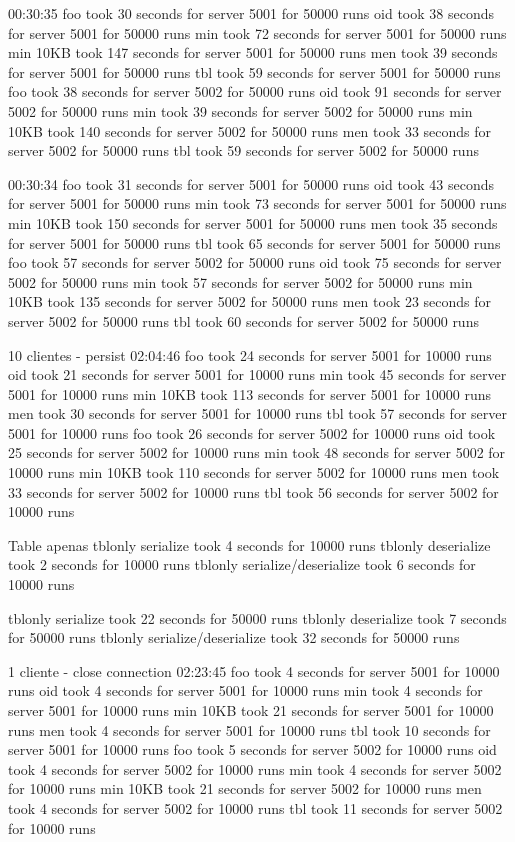 \documentclass[11pt]{article}
\begin{document}
00:30:35
foo took 30 seconds for server 5001 for 50000 runs
oid took 38 seconds for server 5001 for 50000 runs
min took 72 seconds for server 5001 for 50000 runs
min 10KB took 147 seconds for server 5001 for 50000 runs
men took 39 seconds for server 5001 for 50000 runs
tbl took 59 seconds for server 5001 for 50000 runs
foo took 38 seconds for server 5002 for 50000 runs
oid took 91 seconds for server 5002 for 50000 runs
min took 39 seconds for server 5002 for 50000 runs
min 10KB took 140 seconds for server 5002 for 50000 runs
men took 33 seconds for server 5002 for 50000 runs
tbl took 59 seconds for server 5002 for 50000 runs

00:30:34
foo took 31 seconds for server 5001 for 50000 runs
oid took 43 seconds for server 5001 for 50000 runs
min took 73 seconds for server 5001 for 50000 runs
min 10KB took 150 seconds for server 5001 for 50000 runs
men took 35 seconds for server 5001 for 50000 runs
tbl took 65 seconds for server 5001 for 50000 runs
foo took 57 seconds for server 5002 for 50000 runs
oid took 75 seconds for server 5002 for 50000 runs
min took 57 seconds for server 5002 for 50000 runs
min 10KB took 135 seconds for server 5002 for 50000 runs
men took 23 seconds for server 5002 for 50000 runs
tbl took 60 seconds for server 5002 for 50000 runs


 10 clientes - persist
02:04:46
foo took 24 seconds for server 5001 for 10000 runs
oid took 21 seconds for server 5001 for 10000 runs
min took 45 seconds for server 5001 for 10000 runs
min 10KB took 113 seconds for server 5001 for 10000 runs
men took 30 seconds for server 5001 for 10000 runs
tbl took 57 seconds for server 5001 for 10000 runs
foo took 26 seconds for server 5002 for 10000 runs
oid took 25 seconds for server 5002 for 10000 runs
min took 48 seconds for server 5002 for 10000 runs
min 10KB took 110 seconds for server 5002 for 10000 runs
men took 33 seconds for server 5002 for 10000 runs
tbl took 56 seconds for server 5002 for 10000 runs


 Table apenas
tblonly serialize took 4 seconds for 10000 runs
tblonly deserialize took 2 seconds for 10000 runs
tblonly serialize/deserialize took 6 seconds for 10000 runs

tblonly serialize took 22 seconds for 50000 runs
tblonly deserialize took 7 seconds for 50000 runs
tblonly serialize/deserialize took 32 seconds for 50000 runs


 1 cliente - close connection
02:23:45
foo took 4 seconds for server 5001 for 10000 runs
oid took 4 seconds for server 5001 for 10000 runs
min took 4 seconds for server 5001 for 10000 runs
min 10KB took 21 seconds for server 5001 for 10000 runs
men took 4 seconds for server 5001 for 10000 runs
tbl took 10 seconds for server 5001 for 10000 runs
foo took 5 seconds for server 5002 for 10000 runs
oid took 4 seconds for server 5002 for 10000 runs
min took 4 seconds for server 5002 for 10000 runs
min 10KB took 21 seconds for server 5002 for 10000 runs
men took 4 seconds for server 5002 for 10000 runs
tbl took 11 seconds for server 5002 for 10000 runs
\end{document}
